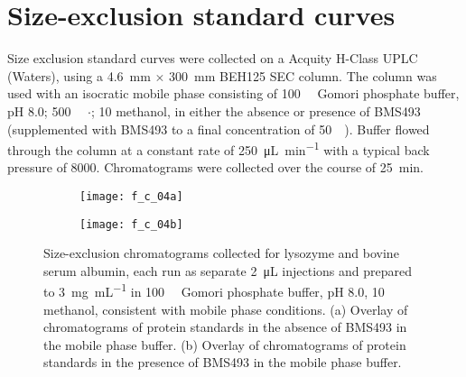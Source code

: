 \section{Size-exclusion standard curves}
Size exclusion standard curves were collected on a Acquity H-Class UPLC
(Waters), using a \SI{4.6}{\mm} ${\times}$ \SI{300}{\mm} BEH125 SEC column. The
column was used with an isocratic mobile phase consisting of
\SI{100}{\milli\moLar} Gomori phosphate buffer, pH 8.0;
\SI{500}{\milli\moLar} ${\cdot}$;
\SI{10}{\volper} methanol, 
in either the absence or presence of BMS493 (supplemented with BMS493 to a final
concentration of \SI{50}{\micro\moLar}). Buffer flowed through the column at a
constant rate of \SI{250}{\uL\per\minute} with a typical back pressure of
\SI{8000}{\psi}. Chromatograms were collected over the
course of \SI{25}{\minute}.
\begin{figure}
    \centering
    \begin{subfigure}[b]{0.8\textwidth}
        \texttt{[image: f\_c\_04a]}
        \caption{}
    \end{subfigure}
    \begin{subfigure}[b]{0.8\textwidth}
        \texttt{[image: f\_c\_04b]}
        \caption{}
    \end{subfigure}
    \caption{Size-exclusion chromatograms collected for lysozyme and bovine
        serum albumin, each run as separate \SI{2}{\micro\liter} injections and
        prepared to \SI{3}{\mg\per\mL} in \SI{100}{\milli\moLar} Gomori
        phosphate buffer, pH 8.0, \SI{10}{\volper} methanol, consistent with
        mobile phase conditions. (a) Overlay of chromatograms of protein
        standards in the absence of BMS493 in the mobile phase buffer. (b)
        Overlay of chromatograms of protein standards in the presence of BMS493
        in the mobile phase buffer.}\label{fig:sec_standards}
\end{figure}
